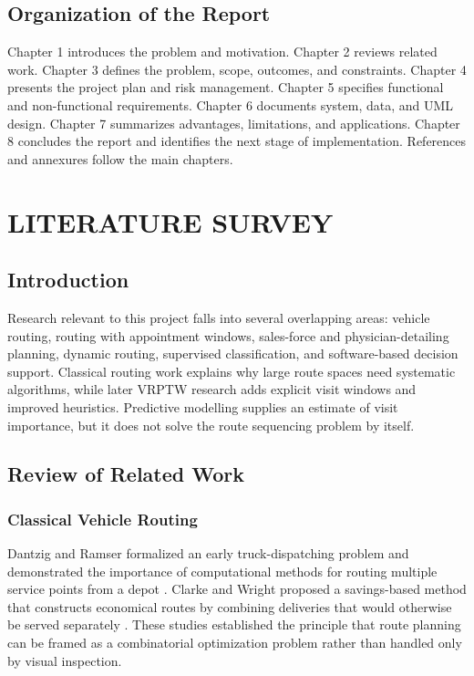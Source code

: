 \documentclass[12pt,a4paper,oneside]{report}
\begin{document}
\section{Organization of the Report}
Chapter 1 introduces the problem and motivation. Chapter 2 reviews related work. Chapter 3 defines the problem, scope, outcomes, and constraints. Chapter 4 presents the project plan and risk management. Chapter 5 specifies functional and non-functional requirements. Chapter 6 documents system, data, and UML design. Chapter 7 summarizes advantages, limitations, and applications. Chapter 8 concludes the report and identifies the next stage of implementation. References and annexures follow the main chapters.

\chapter{LITERATURE SURVEY}

\section{Introduction}
Research relevant to this project falls into several overlapping areas: vehicle routing, routing with appointment windows, sales-force and physician-detailing planning, dynamic routing, supervised classification, and software-based decision support. Classical routing work explains why large route spaces need systematic algorithms, while later VRPTW research adds explicit visit windows and improved heuristics. Predictive modelling supplies an estimate of visit importance, but it does not solve the route sequencing problem by itself.

\section{Review of Related Work}
\subsection{Classical Vehicle Routing}
Dantzig and Ramser formalized an early truck-dispatching problem and demonstrated the importance of computational methods for routing multiple service points from a depot \cite{dantzig1959}. Clarke and Wright proposed a savings-based method that constructs economical routes by combining deliveries that would otherwise be served separately \cite{clarke1964}. These studies established the principle that route planning can be framed as a combinatorial optimization problem rather than handled only by visual inspection.
\end{document}
